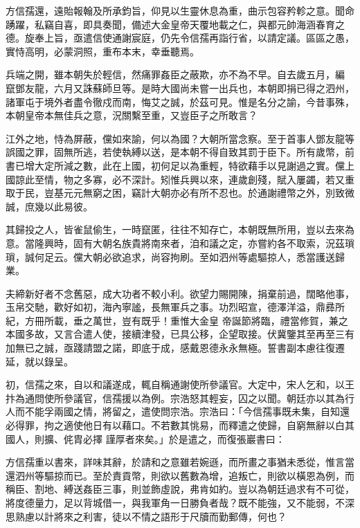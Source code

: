 \begin{pinyinscope}
 方信孺還，遠貽報翰及所承鈞旨，仰見以生靈休息為重，曲示包容矜軫之意。聞命踴躍，私竊自喜，即具奏聞，備述大金皇帝天覆地載之仁，與都元帥海涵春育之德。旋奉上旨，亟遣信使通謝宸庭，仍先令信孺再詣行省，以請定議。區區之愚，實恃高明，必蒙洞照，重布本末，幸垂聽焉。



 兵端之開，雖本朝失於輕信，然痛罪姦臣之蔽欺，亦不為不早。自去歲五月，編
 竄鄧友龍，六月又誅蘇師旦等。是時大國尚未嘗一出兵也，本朝即捐已得之泗州，諸軍屯于境外者盡令徹戍而南，悔艾之誠，於茲可見。惟是名分之諭，今昔事殊，本朝皇帝本無佳兵之意，況關繫至重，又豈臣子之所敢言？



 江外之地，恃為屏蔽，儻如來諭，何以為國？大朝所當念察。至于首事人鄧友龍等誤國之罪，固無所逃，若使執縛以送，是本朝不得自致其罰于臣下。所有歲幣，前書已增大定所減之數，此在上國，初何足以為重輕，特欲藉手以見謝過之實。儻上國諒此至情，物之多寡，必不深計。矧惟兵興以來，連歲創殘，賦入屢蠲，若又重
 取于民，豈基元元無窮之困，竊計大朝亦必有所不忍也。於通謝禮幣之外，別致微誠，庶幾以此易彼。



 其歸投之人，皆雀鼠偷生，一時竄匿，往往不知存亡，本朝既無所用，豈以去來為意。當隆興時，固有大朝名族貴將南來者，洎和議之定，亦嘗約各不取索，況茲瑣瑣，誠何足云。儻大朝必欲追求，尚容拘刷。至如泗州等處驅掠人，悉當護送歸業。



 夫締新好者不念舊惡，成大功者不較小利。欲望力賜開陳，捐棄前過，闊略他事，玉帛交馳，歡好如初，海內寧謐，長無軍兵之事。功烈昭宣，德澤洋溢，鼎彞所紀，方冊所載，垂之萬世，豈有既乎！重惟大金皇
 帝誕節將臨，禮當修賀，兼之本國多故，又言合遣人使，接續津發，已具公移，企望取接。伏冀鑒其至再至三有加無已之誠，亟踐請盟之諾，即底于成，感戴恩德永永無極。誓書副本慮往復遷延，就以錄呈。



 初，信孺之來，自以和議遂成，輒自稱通謝使所參議官。大定中，宋人乞和，以王抃為通問使所參議官，信孺援以為例。宗浩怒其輕妄，囚之以聞。朝廷亦以其為行人而不能孚兩國之情，將留之，遣使問宗浩。宗浩曰：「今信孺事既未集，自知還必得罪，拘之適使他日有以藉口。不若數其恌易，而釋遣之使歸，自窮無辭以白其國人，則擴、侂胄必擇
 謹厚者來矣。」於是遣之，而復張巖書曰：



 方信孺重以書來，詳味其辭，於請和之意雖若婉遜，而所畫之事猶未悉從，惟言當還泗州等驅掠而已。至於責貢幣，則欲以舊數為增，追叛亡，則欲以橫恩為例，而稱臣、割地、縛送姦臣三事，則並飾虛說，弗肯如約。豈以為朝廷過求有不可從，將度德量力，足以背城借一，與我軍角一日勝負者哉？既不能強，又不能弱，不深思熟慮以計將來之利害，徒以不情之語形于尺牘而勤郵傳，何也？




\end{pinyinscope}
